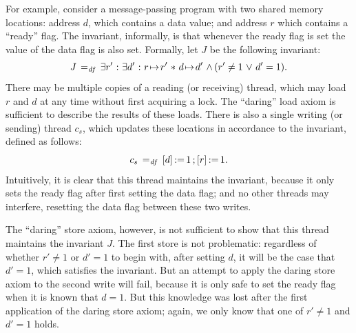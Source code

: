 \documentclass[11pt]{report}
\begin{document}
For example, consider a message-passing program with two shared memory locations: address $d$, which contains a data value; and address $r$ which contains a ``ready'' flag. The invariant, informally, is that whenever the ready flag is set the value of the data flag is also set. Formally, let $J$ be the following invariant: \[ J \operatorname{\;=_{\mathit{df}}\;} \exists r' \operatorname{\,:\,} \exists d' \operatorname{\,:\,} r \!\mapsto\! r' \operatorname{\,\ast\,} d \!\mapsto\! d' \operatorname{\,\wedge\,} (r' \neq 1 \operatorname{\,\vee\,} d' = 1).\] There may be multiple copies of a reading (or receiving) thread, which may load $r$ and $d$ at any time without first acquiring a lock. The ``daring'' load axiom is sufficient to describe the results of these loads. There is also a single writing (or sending) thread $c_s$, which updates these locations in accordance to the invariant, defined as follows: \[ c_s \operatorname{\;=_{\mathit{df}}\;} \left[ d \right] \operatorname{:\!=} 1 \operatorname{;} \left[ r \right] \operatorname{:\!=} 1.\] Intuitively, it is clear that this thread maintains the invariant, because it only sets the ready flag after first setting the data flag; and no other threads may interfere, resetting the data flag between these two writes. 

The ``daring'' store axiom, however, is not sufficient to show that this thread maintains the invariant $J$. The first store is not problematic: regardless of whether $r' \neq 1$ or $d' = 1$ to begin with, after setting $d$, it will be the case that $d' = 1$, which satisfies the invariant. But an attempt to apply the daring store axiom to the second write will fail, because it is only safe to set the ready flag when it is known that $d = 1$. But this knowledge was lost after the first application of the daring store axiom; again, we only know that one of $r' \neq 1$ and $d' = 1$ holds. 
\end{document}

